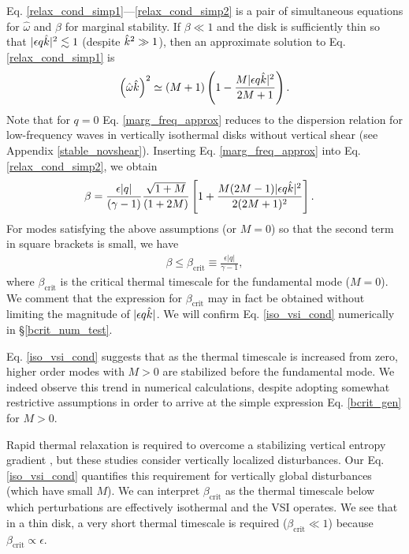 Eq. \ref{relax_cond_simp1}---\ref{relax_cond_simp2} is a pair of
simultaneous equations for $\hat{\omega}$ and $\beta$ for marginal
stability. If $\beta\ll 1$ and the disk is sufficiently thin so that  
$|\epsilon q \hat{k} |^2\lesssim 1$ (despite $\hat{k}^2\gg 1$), 
then an approximate solution to Eq. \ref{relax_cond_simp1} is 
\begin{align}
  \left(\hat{\omega}\hat{k}\right)^2 \simeq (M+1)\left(1 -
    \frac{M|\epsilon q \hat{k}|^2}{2M+1}\right).  \label{marg_freq_approx}
\end{align}
Note that for $q=0$ Eq. \ref{marg_freq_approx} reduces to 
the dispersion relation for low-frequency waves in vertically
isothermal disks without vertical shear (see Appendix
\ref{stable_novshear}). Inserting Eq. \ref{marg_freq_approx} into
Eq. \ref{relax_cond_simp2}, we obtain 
\begin{align}\label{bcrit_gen}
  \beta &= \frac{\epsilon|q|}{(\gamma - 1)}
  \frac{\sqrt{1+M}}{(1+2M)}\left[1 + \frac{M(2M-1)|\epsilon q
      \hat{k}|^2}{2(2M+1)^2}\right].
\end{align}
For modes satisfying the above assumptions (or $M=0$) so that the
second term in square brackets is small, we have 
\begin{align}\label{iso_vsi_cond}
  \beta\leq \beta_\mathrm{crit}  \equiv
  \frac{\epsilon|q|}{\gamma-1}, 
\end{align}
where $\beta_\mathrm{crit}$
is the critical thermal timescale for the fundamental mode
($M=0$). We comment that the expression for $\beta_\mathrm{crit}$ may
in fact be obtained without limiting the magnitude of $|\epsilon q   
\hat{k}|$.  We will confirm Eq. \ref{iso_vsi_cond} numerically in
\S\ref{bcrit_num_test}. 

Eq. \ref{iso_vsi_cond} suggests that as the thermal timescale is
increased from zero, higher order modes with $M>0$
are stabilized before the fundamental mode. We indeed observe this
trend in numerical calculations, despite adopting somewhat restrictive
assumptions in order to arrive at the simple expression 
Eq. \ref{bcrit_gen} for $M>0$. 

Rapid thermal relaxation is required to overcome a stabilizing
vertical entropy gradient \citep{goldreich67,urpin98,urpin03}, but these
studies consider vertically localized disturbances. Our 
Eq. \ref{iso_vsi_cond} quantifies this requirement for vertically
global disturbances (which have small $M$).  We can interpret
$\beta_\mathrm{crit}$ as the thermal timescale below which
perturbations are effectively isothermal and the VSI operates.  We see
that in a thin disk, a very short thermal timescale is required
($\beta_\mathrm{crit}\ll 1$) because $\beta_\mathrm{crit}\propto \epsilon$. 





